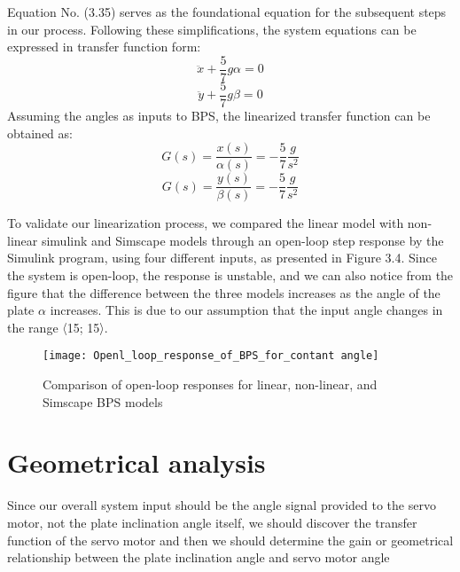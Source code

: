Equation No. (3.35) serves as the foundational equation for the subsequent steps in our process. Following these simplifications, the system equations can be expressed in transfer function form:
\begin{equation}\ddot{x} +\frac{5}{7}g \alpha = 0 \end{equation}
\begin{equation}\ddot{y} +\frac{5}{7}g \beta = 0 \end{equation}
Assuming the angles as inputs to BPS, the linearized transfer function can be obtained as:
\begin{equation}     G(s) = \frac{x(s)}{\alpha(s)} = -\frac{5}{7}\frac{g}{s^2} \end{equation}
\begin{equation} G(s) = \frac{y(s)}{\beta(s)} = -\frac{5}{7}\frac{g}{s^2} \end{equation}

To validate our linearization process, we compared the linear model with non-linear simulink and Simscape models through an open-loop step response by the Simulink program, using four different inputs, as presented in Figure 3.4. Since the system is open-loop, the response is unstable, and we can also notice from the figure that the difference between the three models increases as the angle of the plate \(\alpha\) increases. This is due to our assumption that the input angle changes in the range 〈15; 15〉.

\begin{figure}[h]
    \centering
    \texttt{[image: Openl\_loop\_response\_of\_BPS\_for\_contant angle]}
    \caption{Comparison of open-loop responses for linear, non-linear, and Simscape BPS models}
\end{figure}

\section{Geometrical analysis}
Since our overall system input should be the angle signal provided to the servo motor, not the plate inclination angle itself, we should discover the transfer function of the servo motor and then we should determine the gain or geometrical relationship between the plate inclination angle and servo motor angle
